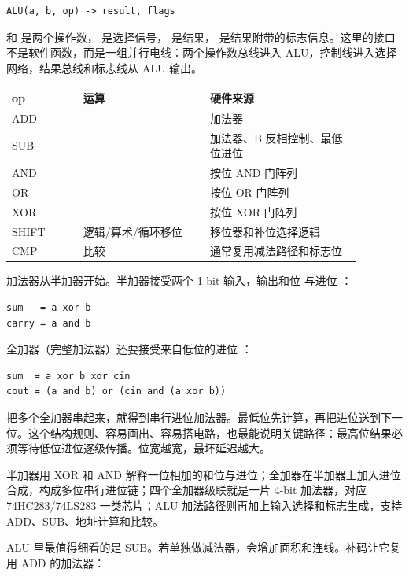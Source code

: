 \begin{lstlisting}
ALU(a, b, op) -> result, flags
\end{lstlisting}

 和  是两个操作数， 是选择信号， 是结果， 是结果附带的标志信息。这里的接口不是软件函数，而是一组并行电线：两个操作数总线进入 ALU，控制线进入选择网络，结果总线和标志线从 ALU 输出。

\begin{longtable}{L{0.18\linewidth}L{0.32\linewidth}L{0.38\linewidth}}
\toprule
op & 运算 & 硬件来源 \\
\midrule
ADD &  & 加法器 \\\tablerowrule
SUB &  & 加法器、B 反相控制、最低位进位 \\\tablerowrule
AND &  & 按位 AND 门阵列 \\\tablerowrule
OR &  & 按位 OR 门阵列 \\\tablerowrule
XOR &  & 按位 XOR 门阵列 \\\tablerowrule
SHIFT & 逻辑/算术/循环移位 & 移位器和补位选择逻辑 \\\tablerowrule
CMP & 比较 & 通常复用减法路径和标志位 \\
\bottomrule
\end{longtable}

加法器从半加器开始。半加器接受两个 1-bit 输入，输出和位  与进位 ：

\begin{lstlisting}
sum   = a xor b
carry = a and b
\end{lstlisting}

全加器（完整加法器）还要接受来自低位的进位 ：

\begin{lstlisting}
sum  = a xor b xor cin
cout = (a and b) or (cin and (a xor b))
\end{lstlisting}

把多个全加器串起来，就得到串行进位加法器。最低位先计算，再把进位送到下一位。这个结构规则、容易画出、容易搭电路，也最能说明关键路径：最高位结果必须等待低位进位逐级传播。位宽越宽，最坏延迟越大。

半加器用 XOR 和 AND 解释一位相加的和位与进位；全加器在半加器上加入进位合成，构成多位串行进位链；四个全加器级联就是一片 4-bit 加法器，对应 74HC283/74LS283 一类芯片；ALU 加法路径则再加上输入选择和标志生成，支持 ADD、SUB、地址计算和比较。

ALU 里最值得细看的是 SUB。若单独做减法器，会增加面积和连线。补码让它复用 ADD 的加法器：

